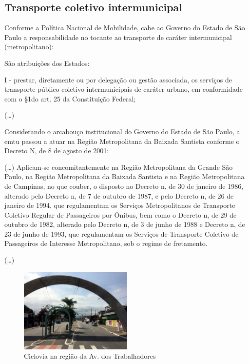 	\subsection{Transporte coletivo intermunicipal}
	
	Conforme a Política Nacional de Mobilidade, cabe ao Governo do Estado de São Paulo a responsabilidade no tocante ao transporte de caráter intermunicipal (metropolitano):
	
	\begin{citacao}
		São atribuições dos Estados: 
		
		I - prestar, diretamente ou por delegação ou gestão associada, os serviços de transporte público coletivo intermunicipais de caráter urbano, em conformidade com o \S 1\textordmasculine do art. 25 da Constituição Federal;
		
		(\dots)
		
		\cite[Art. 17\textordmasculine, inciso I]{gf2012a}
	\end{citacao}
	
	Considerando o arcabouço institucional do Governo do Estado de São Paulo, a \gls{emtu} passou a atuar na Região Metropolitana da Baixada Santista conforme o Decreto N, de 8 de agosto de 2001:
	
	\begin{citacao}
		(\dots) Aplicam-se concomitantemente na Região Metropolitana da Grande São Paulo, na Região Metropolitana da Baixada Santista e na Região Metropolitana de Campinas, no que couber, o disposto no Decreto n, de 30 de janeiro de 1986, alterado pelo Decreto n, de 7 de outubro de 1987, e pelo Decreto n, de 26 de janeiro de 1994, que regulamentam os Serviços Metropolitanos de Transporte Coletivo Regular de Passageiros por Ônibus, bem como o Decreto n, de 29 de outubro de 1982, alterado pelo Decreto n, de 3 de junho de 1988 e Decreto n, de 23 de junho de 1993, que regulamentam os Serviços de Transporte Coletivo de Passageiros de Interesse Metropolitano, sob o regime de fretamento.
		
		(\dots)
		
		\cite[Art. 2\textordmasculine]{gesp2001a}
	\end{citacao}

	\begin{figure}[p]
		\centering
		\caption{Ciclovia na região da Av. dos Trabalhadores}
		\includegraphics[width=0.5\textwidth]{img/IMG_2029.JPG}
	\end{figure}
	
